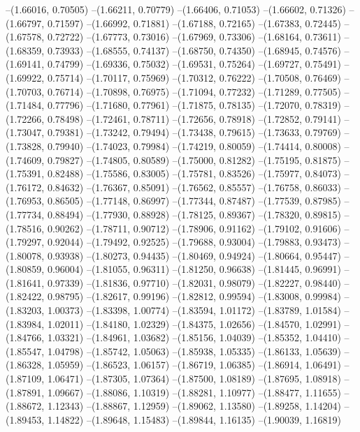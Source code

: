 --(1.66016, 0.70505)
--(1.66211, 0.70779)
--(1.66406, 0.71053)
--(1.66602, 0.71326)
--(1.66797, 0.71597)
--(1.66992, 0.71881)
--(1.67188, 0.72165)
--(1.67383, 0.72445)
--(1.67578, 0.72722)
--(1.67773, 0.73016)
--(1.67969, 0.73306)
--(1.68164, 0.73611)
--(1.68359, 0.73933)
--(1.68555, 0.74137)
--(1.68750, 0.74350)
--(1.68945, 0.74576)
--(1.69141, 0.74799)
--(1.69336, 0.75032)
--(1.69531, 0.75264)
--(1.69727, 0.75491)
--(1.69922, 0.75714)
--(1.70117, 0.75969)
--(1.70312, 0.76222)
--(1.70508, 0.76469)
--(1.70703, 0.76714)
--(1.70898, 0.76975)
--(1.71094, 0.77232)
--(1.71289, 0.77505)
--(1.71484, 0.77796)
--(1.71680, 0.77961)
--(1.71875, 0.78135)
--(1.72070, 0.78319)
--(1.72266, 0.78498)
--(1.72461, 0.78711)
--(1.72656, 0.78918)
--(1.72852, 0.79141)
--(1.73047, 0.79381)
--(1.73242, 0.79494)
--(1.73438, 0.79615)
--(1.73633, 0.79769)
--(1.73828, 0.79940)
--(1.74023, 0.79984)
--(1.74219, 0.80059)
--(1.74414, 0.80008)
--(1.74609, 0.79827)
--(1.74805, 0.80589)
--(1.75000, 0.81282)
--(1.75195, 0.81875)
--(1.75391, 0.82488)
--(1.75586, 0.83005)
--(1.75781, 0.83526)
--(1.75977, 0.84073)
--(1.76172, 0.84632)
--(1.76367, 0.85091)
--(1.76562, 0.85557)
--(1.76758, 0.86033)
--(1.76953, 0.86505)
--(1.77148, 0.86997)
--(1.77344, 0.87487)
--(1.77539, 0.87985)
--(1.77734, 0.88494)
--(1.77930, 0.88928)
--(1.78125, 0.89367)
--(1.78320, 0.89815)
--(1.78516, 0.90262)
--(1.78711, 0.90712)
--(1.78906, 0.91162)
--(1.79102, 0.91606)
--(1.79297, 0.92044)
--(1.79492, 0.92525)
--(1.79688, 0.93004)
--(1.79883, 0.93473)
--(1.80078, 0.93938)
--(1.80273, 0.94435)
--(1.80469, 0.94924)
--(1.80664, 0.95447)
--(1.80859, 0.96004)
--(1.81055, 0.96311)
--(1.81250, 0.96638)
--(1.81445, 0.96991)
--(1.81641, 0.97339)
--(1.81836, 0.97710)
--(1.82031, 0.98079)
--(1.82227, 0.98440)
--(1.82422, 0.98795)
--(1.82617, 0.99196)
--(1.82812, 0.99594)
--(1.83008, 0.99984)
--(1.83203, 1.00373)
--(1.83398, 1.00774)
--(1.83594, 1.01172)
--(1.83789, 1.01584)
--(1.83984, 1.02011)
--(1.84180, 1.02329)
--(1.84375, 1.02656)
--(1.84570, 1.02991)
--(1.84766, 1.03321)
--(1.84961, 1.03682)
--(1.85156, 1.04039)
--(1.85352, 1.04410)
--(1.85547, 1.04798)
--(1.85742, 1.05063)
--(1.85938, 1.05335)
--(1.86133, 1.05639)
--(1.86328, 1.05959)
--(1.86523, 1.06157)
--(1.86719, 1.06385)
--(1.86914, 1.06491)
--(1.87109, 1.06471)
--(1.87305, 1.07364)
--(1.87500, 1.08189)
--(1.87695, 1.08918)
--(1.87891, 1.09667)
--(1.88086, 1.10319)
--(1.88281, 1.10977)
--(1.88477, 1.11655)
--(1.88672, 1.12343)
--(1.88867, 1.12959)
--(1.89062, 1.13580)
--(1.89258, 1.14204)
--(1.89453, 1.14822)
--(1.89648, 1.15483)
--(1.89844, 1.16135)
--(1.90039, 1.16819)
